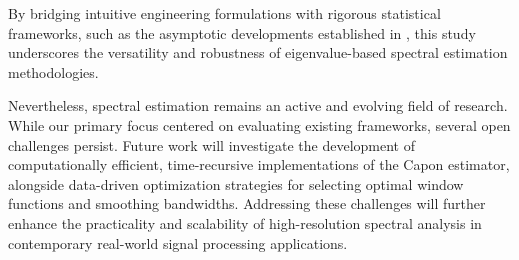 \documentclass[twoside]{article}
\begin{document}
By bridging intuitive engineering formulations with rigorous statistical frameworks, such as the asymptotic developments established in \cite{NematollahiSubbaRao:2005}, this study underscores the versatility and robustness of eigenvalue-based spectral estimation methodologies.



Nevertheless, spectral estimation remains an active and evolving field of research. While our primary focus centered on evaluating existing frameworks, several open challenges persist. Future work will investigate the development of computationally efficient, time-recursive implementations of the Capon estimator, alongside data-driven optimization strategies for selecting optimal window functions and smoothing bandwidths. Addressing these challenges will further enhance the practicality and scalability of high-resolution spectral analysis in contemporary real-world signal processing applications.
\end{document}
